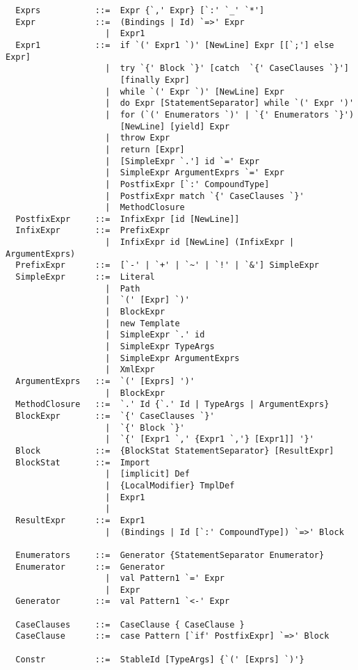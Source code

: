 \begin{lstlisting}
  Exprs           ::=  Expr {`,' Expr} [`:' `_' `*']
  Expr            ::=  (Bindings | Id) `=>' Expr
                    |  Expr1
  Expr1           ::=  if `(' Expr1 `)' [NewLine] Expr [[`;'] else Expr]
                    |  try `{' Block `}' [catch  `{' CaseClauses `}'] 
                       [finally Expr]
                    |  while `(' Expr `)' [NewLine] Expr
                    |  do Expr [StatementSeparator] while `(' Expr ')'
                    |  for (`(' Enumerators `)' | `{' Enumerators `}') 
                       [NewLine] [yield] Expr
                    |  throw Expr
                    |  return [Expr]
                    |  [SimpleExpr `.'] id `=' Expr
                    |  SimpleExpr ArgumentExprs `=' Expr
                    |  PostfixExpr [`:' CompoundType]
                    |  PostfixExpr match `{' CaseClauses `}'
                    |  MethodClosure
  PostfixExpr     ::=  InfixExpr [id [NewLine]]
  InfixExpr       ::=  PrefixExpr
                    |  InfixExpr id [NewLine] (InfixExpr | ArgumentExprs)
  PrefixExpr      ::=  [`-' | `+' | `~' | `!' | `&'] SimpleExpr 
  SimpleExpr      ::=  Literal
                    |  Path
                    |  `(' [Expr] `)'
                    |  BlockExpr
                    |  new Template 
                    |  SimpleExpr `.' id 
                    |  SimpleExpr TypeArgs
                    |  SimpleExpr ArgumentExprs
                    |  XmlExpr
  ArgumentExprs   ::=  `(' [Exprs] ')'
                    |  BlockExpr
  MethodClosure   ::=  `.' Id {`.' Id | TypeArgs | ArgumentExprs}
  BlockExpr       ::=  `{' CaseClauses `}'
                    |  `{' Block `}'
                    |  `{' [Expr1 `,' {Expr1 `,'} [Expr1]] '}'
  Block           ::=  {BlockStat StatementSeparator} [ResultExpr]
  BlockStat       ::=  Import
                    |  [implicit] Def
                    |  {LocalModifier} TmplDef
                    |  Expr1
                    |
  ResultExpr      ::=  Expr1
                    |  (Bindings | Id [`:' CompoundType]) `=>' Block

  Enumerators     ::=  Generator {StatementSeparator Enumerator}
  Enumerator      ::=  Generator
                    |  val Pattern1 `=' Expr
                    |  Expr
  Generator       ::=  val Pattern1 `<-' Expr

  CaseClauses     ::=  CaseClause { CaseClause }
  CaseClause      ::=  case Pattern [`if' PostfixExpr] `=>' Block 

  Constr          ::=  StableId [TypeArgs] {`(' [Exprs] `)'}


\end{lstlisting}
